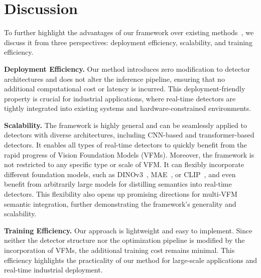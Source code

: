\section{Discussion}
To further highlight the advantages of our framework over existing methods~\cite{peng2024d,huang2025real}, we discuss it from three perspectives: deployment efficiency, scalability, and training efficiency.

\noindent \textbf{Deployment Efficiency.}
Our method introduces zero modification to detector architectures and does not alter the inference pipeline, ensuring that no additional computational cost or latency is incurred. This deployment-friendly property is crucial for industrial applications, where real-time detectors are tightly integrated into existing systems and hardware-constrained environments.

\noindent \textbf{Scalability.}
The framework is highly general and can be seamlessly applied to detectors with diverse architectures, including CNN-based and transformer-based detectors. It enables all types of real-time detectors to quickly benefit from the rapid progress of Vision Foundation Models (VFMs). 
Moreover, the framework is not restricted to any specific type or scale of VFM.
It can flexibly incorporate different foundation models, such as DINOv3~\cite{simeoni2025dinov3}, MAE~\cite{he2022masked}, or CLIP~\cite{radford2021learning}, and even benefit from arbitrarily large models for distilling semantics into real-time detectors.
This flexibility also opens up promising directions for multi-VFM semantic integration, further demonstrating the framework's generality and scalability.

\noindent \textbf{Training Efficiency.}
Our approach is lightweight and easy to implement. Since neither the detector structure nor the optimization pipeline is modified by the incorporation of VFMs, the additional training cost remains minimal. This efficiency highlights the practicality of our method for large-scale applications and real-time industrial deployment.